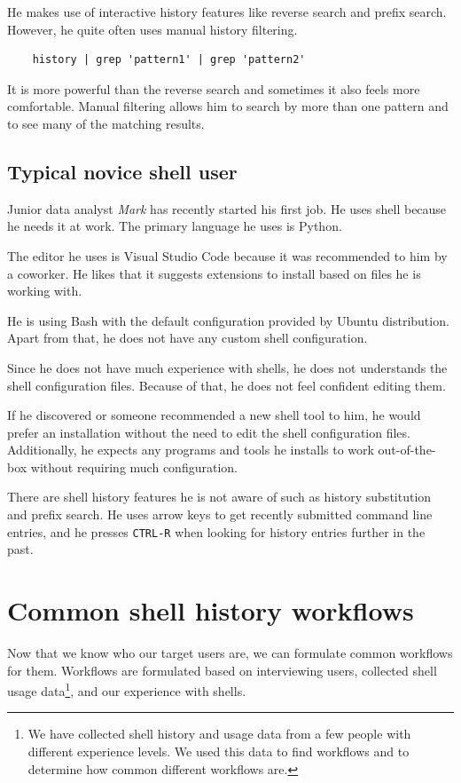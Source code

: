 He makes use of interactive history features like reverse search and prefix search. However, he quite often uses manual history filtering.

\begin{verbatim}
    history | grep 'pattern1' | grep 'pattern2'     
\end{verbatim}

It is more powerful than the reverse search and sometimes it also feels more comfortable. Manual filtering allows him to search by more than one pattern and to see many of the matching results. 

\subsection{Typical novice shell user}

Junior data analyst \textit{Mark} has recently started his first job. He uses shell because he needs it at work. The primary language he uses is Python. 

The editor he uses is Visual Studio Code because it was recommended to him by a coworker. He likes that it suggests extensions to install based on files he is working with.

He is using Bash with the default configuration provided by Ubuntu distribution. Apart from that, he does not have any custom shell configuration. 

Since he does not have much experience with shells, he does not understands the shell configuration files. Because of that, he does not feel confident editing them. 

If he discovered or someone recommended a new shell tool to him, he would prefer an installation without the need to edit the shell configuration files. Additionally, he expects any programs and tools he installs to work out-of-the-box without requiring much configuration. 

There are shell history features he is not aware of such as history substitution and prefix search. He uses arrow keys to get recently submitted command line entries, and he presses \verb|CTRL-R| when looking for history entries further in the past. 


\section{Common shell history workflows}

Now that we know who our target users are, we can formulate common workflows for them. Workflows are formulated based on interviewing users, collected shell usage data\footnote{We have collected shell history and usage data from a few people with different experience levels. We used this data to find workflows and to determine how common different workflows are.}, and our experience with shells. 

